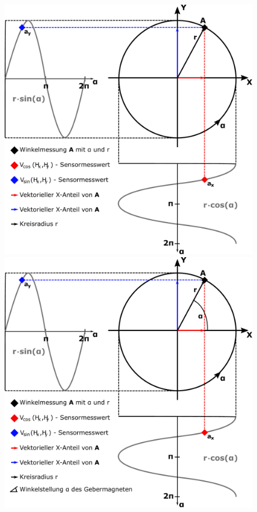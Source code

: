 \documentclass{beamer}
\begin{document}
\begin{frame}
\begin{columns}[c]
\begin{figure}
\begin{overprint}
			\includegraphics[width=\linewidth]{images/Kreisdarstellung_Winkelmessung-3}
			\onslide<4->\includegraphics[width=\linewidth]{images/Kreisdarstellung_Winkelmessung}
		\end{overprint}
	\end{figure}
\end{columns}
\end{frame}
\end{document}
